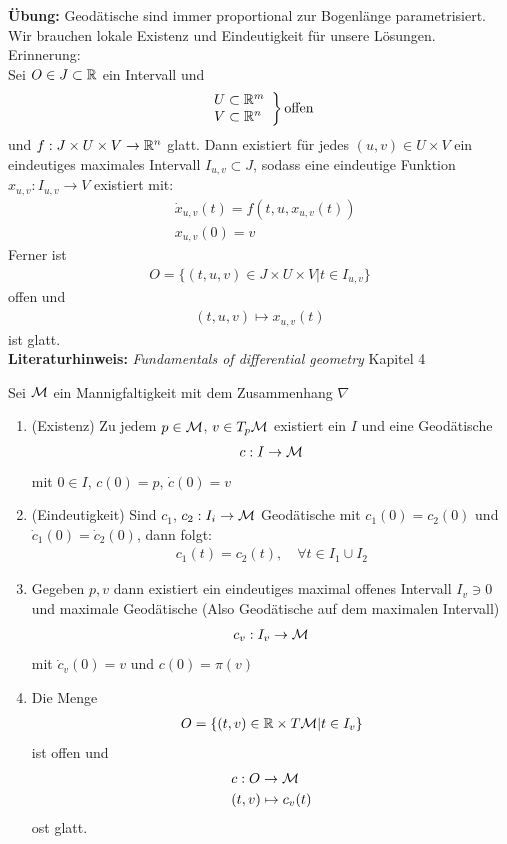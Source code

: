 \textbf{Übung:} Geodätische sind immer proportional zur Bogenlänge parametrisiert.\\
Wir brauchen lokale Existenz und Eindeutigkeit für unsere Lösungen.
Erinnerung:\\
Sei $O \in J \subset \mathbb{R}$ ein Intervall und
\begin{align*}
\left. \begin{array}{l}
U \subset \mathbb{R}^m\\
V \subset \mathbb{R}^n
\end{array}
\right\} 
\mathrm{offen}
\end{align*}
und $f: J \times U \times V \to \mathbb{R}^n$ glatt.
Dann existiert für jedes $(u, v) \in U \times V$ ein eindeutiges maximales Intervall $I_{u, v} \subset J$, sodass eine eindeutige Funktion
$x_{u,v}: I_{u, v} \to V$ existiert mit:
\begin{align*}
&\dot{x}_{u, v} (t) = f(t, u, x_{u,v}(t))\\
&x_{u, v}(0) = v
\end{align*}
Ferner ist 
\begin{align*}
O = \{ (t, u, v) \in J \times U \times V  \vert t \in I_{u, v}\}
\end{align*}
offen und
\begin{align*}
(t, u, v) \mapsto x_{u,v}(t)
\end{align*}
ist glatt.\\
\textbf{Literaturhinweis:} \textit{Fundamentals of differential geometry} Kapitel 4
\begin{satz}
Sei $\mathcal{M}$ ein Mannigfaltigkeit mit dem Zusammenhang $\nabla$
\begin{enumerate}
\item (Existenz) Zu jedem $p \in \mathcal{M}$, $v \in T_p \mathcal{M}$ existiert ein $I$ und eine Geodätische
\begin{align*}
c: I \to \mathcal{M}
\end{align*}
mit $0\in I$, $c(0) = p$, $\dot{c}(0)=v$
\item (Eindeutigkeit) Sind $c_1$, $c_2 : I_i \to \mathcal{M}$ Geodätische mit $c_1(0) = c_2(0)$ und $\dot{c}_1 (0) = \dot{c}_2 (0)$, dann folgt:
\begin{align*}
c_1(t) = c_2(t), \quad \forall t \in I_1 \cup I_2
\end{align*}
\item Gegeben $p, v$ dann existiert ein eindeutiges maximal offenes Intervall $I_v \ni 0$ und maximale Geodätische (Also Geodätische auf dem maximalen Intervall)
\begin{align*}
c_v : I_v \to \mathcal{M}
\end{align*}
mit $\dot{c}_v (0) = v$ und $c(0)= \pi (v)$
\item Die Menge
\begin{align}
O = \{ (t, v) \in \mathbb{R} \times T \mathcal{M} \vert t \in I_v \}
\end{align}
ist offen und 
\begin{align*}
&c: O \to \mathcal{M}\\
& (t,v) \mapsto c_v(t)
\end{align*}
ost glatt.
\end{enumerate}
\end{satz}
